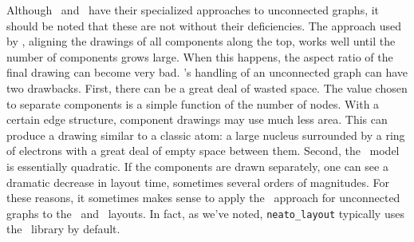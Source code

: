 Although \dot\ and \neato\ have their specialized approaches to
unconnected graphs, it should be noted that these are not without
their deficiencies. The approach used by \dot, aligning the drawings
of all components along the top, works well until the
number of components grows large. When this happens, the aspect
ratio of the final drawing can become very bad. \neato 's handling
of an unconnected graph can have two drawbacks. First, there can be
a great deal of wasted space. The value chosen to separate
components is a simple function of the number of nodes. With a
certain edge structure, component drawings may use much less area.
This can produce a drawing similar to a classic atom: a large nucleus
surrounded by a ring of electrons with a great deal of empty space
between them. Second, the \neato\ model is essentially quadratic.
If the components are drawn separately, one can see a dramatic
decrease in layout time, sometimes several orders of magnitudes.
For these reasons, it sometimes makes sense to apply the \twopi\
approach for unconnected graphs to the \dot\ and \neato\ layouts.
In fact, as we've noted, {\tt neato\_layout} typically uses the \pack\
library by default.

